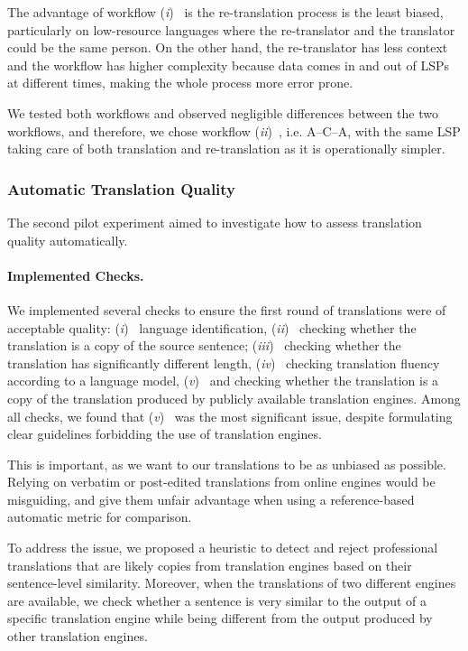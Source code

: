 The advantage of workflow ({\em i})~ is the re-translation process is the least biased, particularly on low-resource languages where the re-translator and the translator could be the same person. On the other hand, the re-translator has less context and the workflow has higher complexity because data comes in and out of LSPs at different times, making the whole process more error prone.

We tested both workflows and observed negligible differences between the two workflows, and therefore, we chose workflow ({\em ii})~, i.e. {A--C--A}, with the same LSP taking care of both translation and re-translation as it is operationally simpler.

\subsubsection{Automatic Translation Quality} The second pilot experiment aimed to investigate how to assess translation quality automatically. 

\paragraph{Implemented Checks.} We implemented several checks to ensure the first round of translations were of acceptable quality: ({\em i})~ language identification, ({\em ii})~ checking whether the translation is a copy of the source sentence; ({\em iii})~ checking whether the translation has significantly different length, ({\em iv})~ checking translation fluency according to a language model, ({\em v})~ and checking whether the translation is a copy of the translation produced by publicly available translation engines. Among all checks, we found that ({\em v})~ was the most significant issue, despite formulating clear guidelines forbidding the use of translation engines.

This is important, as we want to our translations to be as unbiased as possible. Relying on verbatim or post-edited translations from online engines would be misguiding, and give them unfair advantage when using a reference-based automatic metric for comparison.

To address the issue, we proposed a heuristic to detect and reject professional translations that are likely copies from translation engines based on their sentence-level similarity. Moreover, when the translations of two different engines are available, we check whether a sentence is very similar to the output of a specific translation engine while being different from the output produced by other translation engines.

